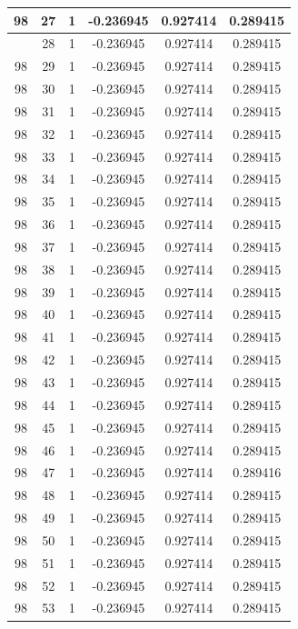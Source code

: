 \documentclass[12pt,a4paper]{article}
\numberwithin{equation}{section}
\numberwithin{figure}{section}
\numberwithin{table}{section}
\begin{document}
\begin{longtable}{|c|c|c|c|c|c|}
98 & 27 & 1 & -0.236945 & 0.927414 & 0.289415 \\ \hline
\pagebreak
98 & 28 & 1 & -0.236945 & 0.927414 & 0.289415 \\ \hline
98 & 29 & 1 & -0.236945 & 0.927414 & 0.289415 \\ \hline
98 & 30 & 1 & -0.236945 & 0.927414 & 0.289415 \\ \hline
98 & 31 & 1 & -0.236945 & 0.927414 & 0.289415 \\ \hline
98 & 32 & 1 & -0.236945 & 0.927414 & 0.289415 \\ \hline
98 & 33 & 1 & -0.236945 & 0.927414 & 0.289415 \\ \hline
98 & 34 & 1 & -0.236945 & 0.927414 & 0.289415 \\ \hline
98 & 35 & 1 & -0.236945 & 0.927414 & 0.289415 \\ \hline
98 & 36 & 1 & -0.236945 & 0.927414 & 0.289415 \\ \hline
98 & 37 & 1 & -0.236945 & 0.927414 & 0.289415 \\ \hline
98 & 38 & 1 & -0.236945 & 0.927414 & 0.289415 \\ \hline
98 & 39 & 1 & -0.236945 & 0.927414 & 0.289415 \\ \hline
98 & 40 & 1 & -0.236945 & 0.927414 & 0.289415 \\ \hline
98 & 41 & 1 & -0.236945 & 0.927414 & 0.289415 \\ \hline
98 & 42 & 1 & -0.236945 & 0.927414 & 0.289415 \\ \hline
98 & 43 & 1 & -0.236945 & 0.927414 & 0.289415 \\ \hline
98 & 44 & 1 & -0.236945 & 0.927414 & 0.289415 \\ \hline
98 & 45 & 1 & -0.236945 & 0.927414 & 0.289415 \\ \hline
98 & 46 & 1 & -0.236945 & 0.927414 & 0.289415 \\ \hline
98 & 47 & 1 & -0.236945 & 0.927414 & 0.289416 \\ \hline
98 & 48 & 1 & -0.236945 & 0.927414 & 0.289415 \\ \hline
98 & 49 & 1 & -0.236945 & 0.927414 & 0.289415 \\ \hline
98 & 50 & 1 & -0.236945 & 0.927414 & 0.289415 \\ \hline
98 & 51 & 1 & -0.236945 & 0.927414 & 0.289415 \\ \hline
98 & 52 & 1 & -0.236945 & 0.927414 & 0.289415 \\ \hline
98 & 53 & 1 & -0.236945 & 0.927414 & 0.289415 \\ \hline

\end{longtable}
\end{document}
